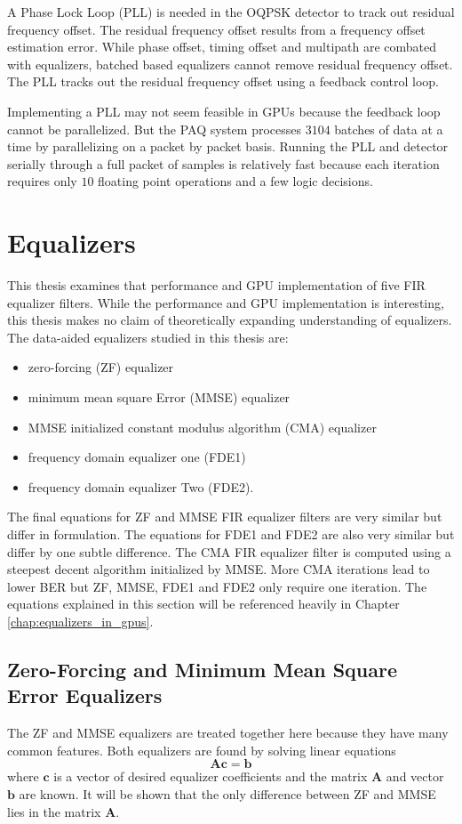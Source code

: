 A Phase Lock Loop (PLL) is needed in the OQPSK detector to track out residual frequency offset.
The residual frequency offset results from a frequency offset estimation error.
While phase offset, timing offset and multipath are combated with equalizers, batched based equalizers cannot remove residual frequency offset.
The PLL tracks out the residual frequency offset using a feedback control loop.

Implementing a PLL may not seem feasible in GPUs because the feedback loop cannot be parallelized.
But the PAQ system processes $3104$ batches of data at a time by parallelizing on a packet by packet basis.
Running the PLL and detector serially through a full packet of samples is relatively fast because each iteration requires only $10$ floating point operations and a few logic decisions.


\section{Equalizers}
\label{sec:equalizer_eq}
This thesis examines that performance and GPU implementation of five FIR equalizer filters.
While the performance and GPU implementation is interesting, this thesis makes no claim of theoretically expanding understanding of equalizers.
The data-aided equalizers studied in this thesis are:
\begin{itemize}
\item zero-forcing (ZF) equalizer
\item minimum mean square Error (MMSE) equalizer
\item MMSE initialized constant modulus algorithm (CMA) equalizer
\item frequency domain equalizer one (FDE1)
\item frequency domain equalizer Two (FDE2).
\end{itemize}
The final equations for ZF and MMSE FIR equalizer filters are very similar but differ in formulation.
The equations for FDE1 and FDE2 are also very similar but differ by one subtle difference.
The CMA FIR equalizer filter is computed using a steepest decent algorithm initialized by MMSE.
More CMA iterations lead to lower BER but ZF, MMSE, FDE1 and FDE2 only require one iteration.
The equations explained in this section will be referenced heavily in Chapter \ref{chap:equalizers_in_gpus}.

\subsection{Zero-Forcing and Minimum Mean Square Error Equalizers}
\label{sec:ZFnMMSE}
The ZF and MMSE equalizers are treated together here because they have many common features.
Both equalizers are found by solving linear equations
\begin{equation}
\mathbf{A}\mathbf{c} = \mathbf{b}
\end{equation}
where $\mathbf{c}$ is a vector of desired equalizer coefficients
and the matrix $\mathbf{A}$ and vector $\mathbf{b}$ are known.
It will be shown that the only difference between ZF and MMSE lies in the matrix $\mathbf{A}$.


